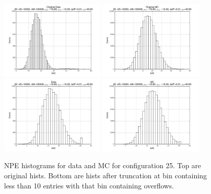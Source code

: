  \begin{figure}[htbp] \begin{center} 
\includegraphics[width=0.45\textwidth]{../FIGURES/25/FIG_Original_Data.pdf} 
\includegraphics[width=0.45\textwidth]{../FIGURES/25/FIG_Original_MC.pdf} 
\includegraphics[width=0.45\textwidth]{../FIGURES/25/FIG_Data.pdf} 
\includegraphics[width=0.45\textwidth]{../FIGURES/25/FIG_MC.pdf} 
\caption{NPE histograms for data and MC for configuration 25. Top are original hists. Bottom are hists after truncation at bin containing less than 10 entries with that bin containing overflows.} 
\label{tab:npe_25} 
\end{center} \end{figure} 

 